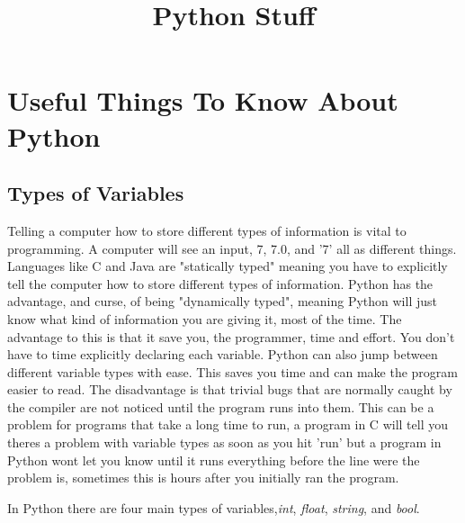 \documentclass[12pt]{book}
\title{Python Stuff}
\newcommand\tab[1][0.5cm]{\hspace*{#1}}
\begin{document}
	
	\maketitle
	\chapter{Useful Things To Know About Python}
	\section{Types of Variables}
	\tab Telling a computer how to store different types of information is vital to programming. A computer will see an input, 7, 7.0, and '7' all as different things. Languages like C and Java are "statically typed" meaning you have to explicitly tell the computer how to store different types of information. Python has the advantage, and curse, of being "dynamically typed", meaning Python will just know what kind of information you are giving it, most of the time. The advantage to this is that it save you, the programmer, time and effort. You don't have to time explicitly declaring each variable. Python can also jump between different variable types with ease.  This saves you time and can make the program easier to read. The disadvantage is that trivial bugs that are normally caught by the compiler are not noticed until the program runs into them. This can be a problem for programs that take a long time to run, a program in C will tell you theres a problem with variable types as soon as you hit 'run' but a program in Python wont let you know until it runs everything before the line were the problem is, sometimes this is hours after you initially ran the program. \par 
	In Python there are four main types of variables,\textit{int}, \textit{float}, \textit{string}, and \textit{bool}.
\end{document}
